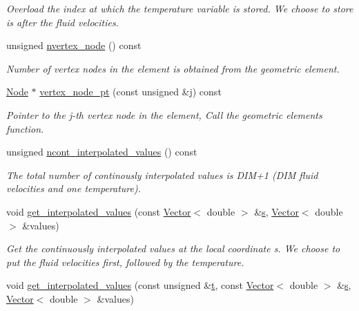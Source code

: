 \begin{DoxyCompactItemize}
\begin{DoxyCompactList}\small\item\em Overload the index at which the temperature variable is stored. We choose to store is after the fluid velocities. \end{DoxyCompactList}\item 
unsigned \hyperlink{classoomph_1_1RefineableBuoyantQCrouzeixRaviartElement_a868eb9a7f06469da529dbbc5b1efe34e}{nvertex\+\_\+node} () const
\begin{DoxyCompactList}\small\item\em Number of vertex nodes in the element is obtained from the geometric element. \end{DoxyCompactList}\item 
\hyperlink{classoomph_1_1Node}{Node} $\ast$ \hyperlink{classoomph_1_1RefineableBuoyantQCrouzeixRaviartElement_a39d79b2fe742148c2d3856ed05ad78db}{vertex\+\_\+node\+\_\+pt} (const unsigned \&j) const
\begin{DoxyCompactList}\small\item\em Pointer to the j-\/th vertex node in the element, Call the geometric element\textquotesingle{}s function. \end{DoxyCompactList}\item 
unsigned \hyperlink{classoomph_1_1RefineableBuoyantQCrouzeixRaviartElement_a98f094a1c3080905d0e90f5ac6ebd1b6}{ncont\+\_\+interpolated\+\_\+values} () const
\begin{DoxyCompactList}\small\item\em The total number of continously interpolated values is D\+I\+M+1 (D\+IM fluid velocities and one temperature). \end{DoxyCompactList}\item 
void \hyperlink{classoomph_1_1RefineableBuoyantQCrouzeixRaviartElement_aa89e116d612b3530edd2b0666d25cf01}{get\+\_\+interpolated\+\_\+values} (const \hyperlink{classoomph_1_1Vector}{Vector}$<$ double $>$ \&\hyperlink{cfortran_8h_ab7123126e4885ef647dd9c6e3807a21c}{s}, \hyperlink{classoomph_1_1Vector}{Vector}$<$ double $>$ \&values)
\begin{DoxyCompactList}\small\item\em Get the continuously interpolated values at the local coordinate s. We choose to put the fluid velocities first, followed by the temperature. \end{DoxyCompactList}\item 
void \hyperlink{classoomph_1_1RefineableBuoyantQCrouzeixRaviartElement_af178c04f0e6ee09a5d05574fcd68ac41}{get\+\_\+interpolated\+\_\+values} (const unsigned \&\hyperlink{cfortran_8h_af6f0bd3dc13317f895c91323c25c2b8f}{t}, const \hyperlink{classoomph_1_1Vector}{Vector}$<$ double $>$ \&\hyperlink{cfortran_8h_ab7123126e4885ef647dd9c6e3807a21c}{s}, \hyperlink{classoomph_1_1Vector}{Vector}$<$ double $>$ \&values)

\end{DoxyCompactItemize}
